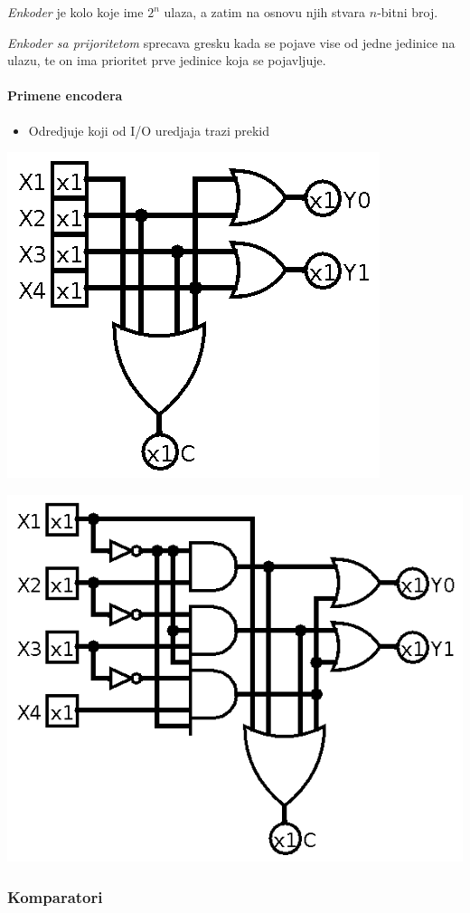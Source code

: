 \documentclass[12p,a4paper]{article}
\begin{document}
\begin{multicols}{2}
    \emph{Enkoder} je kolo koje ime $2^n$ ulaza, a zatim na osnovu njih stvara
    $n$-bitni broj.

    \emph{Enkoder sa prijoritetom} sprecava gresku kada se pojave vise od 
    jedne jedinice na ulazu, te on ima prioritet prve jedinice koja se 
    pojavljuje.

    \paragraph{Primene encodera}
    \begin{itemize}
        \itemsep0em
        \item Odredjuje koji od I/O uredjaja trazi prekid
    \end{itemize}
    \includegraphics[width=0.6\columnwidth]{Figures/encoder.png}

    \includegraphics[width=0.8\columnwidth]{Figures/priority_encoder.png}

    \subsubsection{Komparatori}


\end{multicols}
\end{document}

